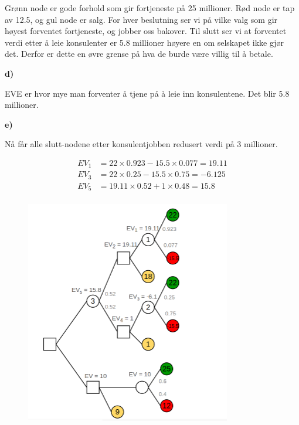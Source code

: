 \documentclass{article}
\begin{document}
Grønn node er gode forhold som gir fortjeneste på 25 millioner. Rød node er tap av 12.5, og gul node er salg. For hver beslutning ser vi på vilke valg som gir høyest forventet fortjeneste, og 
jobber oss bakover. Til slutt ser vi at forventet verdi etter å leie konsulenter er 5.8 millioner høyere en om selskapet ikke gjør det. Derfor er dette en øvre grense på hva de burde være villig til å betale. 

\pagebreak

\vspace*{12pt}\small\textbf{d)}

EVE er hvor mye man forventer å tjene på å leie inn konsulentene. Det blir 5.8 millioner.

\vspace*{12pt}\small\textbf{e)}
\pagebreak


Nå får alle slutt-nodene etter konsulentjobben redusert verdi på 3 millioner. 

\begin{align*}
  EV_1 &= 22 \times 0.923 - 15.5 \times 0.077 = 19.11 \\
  EV_3 &= 22 \times 0.25 - 15.5 \times 0.75 = -6.125 \\
  EV_5 &= 19.11 \times 0.52 + 1 \times 0.48 = 15.8 \\ 
\end{align*}

\begin{figure}[ht]
  \centering
  \includegraphics*[width=0.8\textwidth]{img/1c3.PNG}
\end{figure}
\end{document}
